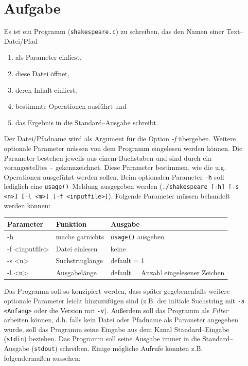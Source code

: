 \documentclass[paper=a4,notitlepage,parskip=half,plainheadsepline]{scrartcl}
\begin{document}
\section{Aufgabe}
Es ist ein Programm (\texttt{shakespeare.c}) zu schreiben, das den Namen einer Text--Datei/Pfad
\begin{enumerate}
\item als Parameter einliest,
\item diese Datei öffnet,
\item deren Inhalt einliest,
\item bestimmte Operationen ausführt und
\item das Ergebnis in die Standard--Ausgabe schreibt.
\end{enumerate}
Der Datei/Pfadname wird als Argument für die Option \emph{-f} übergeben. Weitere optionale Parameter müssen von dem Programm eingelesen werden können. Die Parameter bestehen jeweils aus einem Buchstaben und sind durch ein vorangestelltes \texttt{-} gekennzeichnet. Diese Parameter bestimmen, wie die u.g. Operationen ausgeführt werden sollen. Beim optionalen Parameter \texttt{-h} soll lediglich eine \texttt{usage()}--Meldung ausgegeben werden (\texttt{./shakespeare [-h] [-s <n>] [-l <m>] [-f <inputfile>]}). Folgende  Parameter müssen behandelt werden können:
\begin{center}
\begin{tabular}{|P{4cm}|P{4cm}|P{7cm}|}\hline
Parameter     & Funktion          & Ausgabe\\\hline
-h            & mache garnichts   & \texttt{usage()} ausgeben\\
-f <inputfile>& Datei einlesen    & keine \\
-s  <n>       & Suchstringlänge   & default = 1 \\
-l  <n>       & Ausgabelänge      & default = Anzahl eingelesener Zeichen\\\hline
\end{tabular}
\end{center}
Das Programm soll so konzipiert werden, dass später gegebenenfalls weitere optionale Parameter leicht hinzuzufügen sind (z.B. der initiale Suchstring mit \texttt{-a <Anfang>} oder die Version mit \texttt{-v}).
Außerdem soll das Programm als \emph{Filter} arbeiten können, d.h. falls kein Datei oder Pfadname als Parameter angegeben wurde, soll das Programm seine Eingabe aus dem Kanal Standard--Eingabe (\texttt{stdin}) beziehen. Das Programm soll seine Ausgabe immer in die Standard--Ausgabe (\texttt{stdout}) schreiben.
Einige mögliche Aufrufe könnten z.B. folgendermaßen aussehen:
\end{document}
